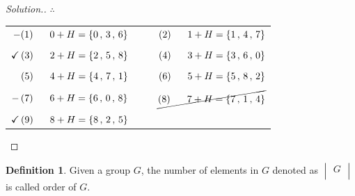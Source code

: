 \documentclass[11pt,a4paper]{article}
\theoremstyle{definition}
\newtheorem{defn}[thm]{Definition}
\newenvironment{solution}
  {\renewcommand{\qedsymbol}{}\begin{proof}[\textit{Solution}.]}
  {\end{proof}}
\begin{document}
\begin{solution}
\vspace{0.5cm}
\begin{table}[H]
\centering
$\therefore\hspace{1cm}$
\begin{tabular}{rccl}
$- (1)\hspace{0.6cm} 0 + H = \{0\, , \, 3\, , \, 6\}$ &&& $(2)\hspace{0.6cm} 1 + H = \{1\, , \, 4\, ,\, 7\}$\\\\
$\checkmark\, (3)\hspace{0.6cm} 2 + H = \{2\,, \, 5\, , \, 8\}$ &&& $(4)\hspace{0.6cm} 3 + H = \{3\, , \, 6\, , \, 0\}$\\\\
$(5)\hspace{0.6cm}  4  + H  = \{4\,  , \, 7\, , \, 1\}$ &&& $(6)\hspace{0.6cm} 5 + H = \{5\, , \, 8\, ,\, 2\}$\\\\
$-\,(7)\hspace{0.6cm} 6 + H =  \{6\, , \, 0\, , \, 8\}$ &&& $\cancel{(8)\hspace{0.6cm} 7  + H = \{7\, , \, 1\, , \, 4\}}$\\\\
$\checkmark \,(9)\hspace{0.6cm} 8 + H = \{8\, , \, 2\, , \, 5\}$ &&&\\
\end{tabular}
\end{table}
\vspace{0.8cm}
\end{solution}











\begin{defn}
Given a group $G$, the number of elements in $G$ denoted as $\begin{vmatrix}
G\\
\end{vmatrix}$ is called order of $G$.\\\\
\end{defn}
\end{document}
